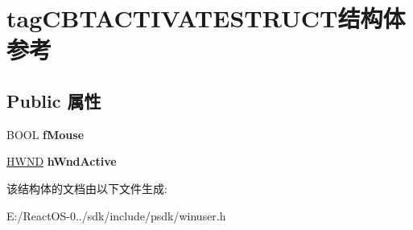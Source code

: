 \hypertarget{structtag_c_b_t_a_c_t_i_v_a_t_e_s_t_r_u_c_t}{}\section{tag\+C\+B\+T\+A\+C\+T\+I\+V\+A\+T\+E\+S\+T\+R\+U\+C\+T结构体 参考}
\label{structtag_c_b_t_a_c_t_i_v_a_t_e_s_t_r_u_c_t}
\subsection*{Public 属性}
\begin{DoxyCompactItemize}
\item 
\mbox{\label{structtag_c_b_t_a_c_t_i_v_a_t_e_s_t_r_u_c_t_af236eb8a837e3ad29366a1f7471d56dd}} 
B\+O\+OL {\bfseries f\+Mouse}
\item 
\mbox{\label{structtag_c_b_t_a_c_t_i_v_a_t_e_s_t_r_u_c_t_a58d1c1c389719785c6b80ed9393f92c7}} 
\hyperlink{interfacevoid}{H\+W\+ND} {\bfseries h\+Wnd\+Active}
\end{DoxyCompactItemize}


该结构体的文档由以下文件生成\+:\begin{DoxyCompactItemize}
\item 
E\+:/\+React\+O\+S-\/0../sdk/include/psdk/winuser.\+h\end{DoxyCompactItemize}
